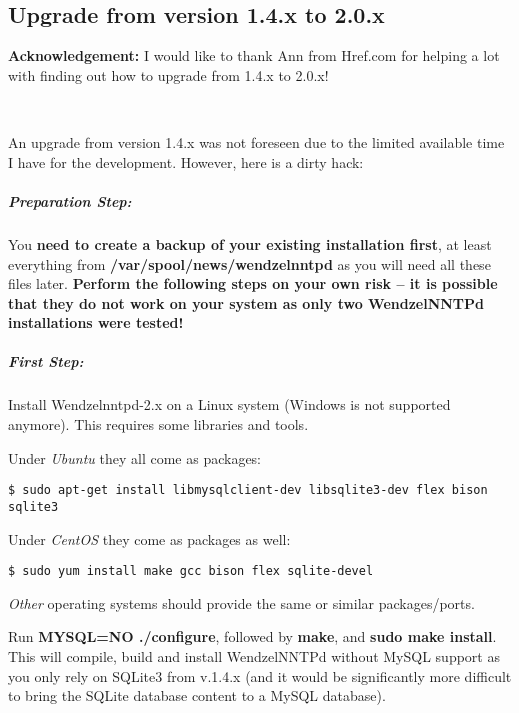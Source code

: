 \documentclass[12pt,fleqn,leqno]{scrbook}
\begin{document}
~

~

\hypertarget{upgrade-from-version-1.4.x-to-2.0.x-1}{%
\subsection{Upgrade from version 1.4.x to
2.0.x}\label{upgrade-from-version-1.4.x-to-2.0.x-1}}

\textbf{Acknowledgement:} I would like to thank Ann from Href.com for
helping a lot with finding out how to upgrade from 1.4.x to 2.0.x!

~

An upgrade from version 1.4.x was not foreseen due to the limited
available time I have for the development. However, here is a dirty
hack:

\hypertarget{preparation-step}{%
\subparagraph*{Preparation Step:}\label{preparation-step}}

You \textbf{need to create a backup of your existing installation
first}, at least everything from \textbf{/var/spool/news/wendzelnntpd}
as you will need all these files later. \textbf{Perform the following
steps on your own risk -- it is possible that they do not work on your
system as only two WendzelNNTPd installations were tested!}

\hypertarget{first-step}{%
\subparagraph*{First Step:}\label{first-step}}

Install Wendzelnntpd-2.x on a Linux system (Windows is not supported
anymore). This requires some libraries and tools.

Under \emph{Ubuntu} they all come as packages:

\begin{verbatim}
$ sudo apt-get install libmysqlclient-dev libsqlite3-dev flex bison sqlite3
\end{verbatim}

Under \emph{CentOS} they come as packages as well:

\begin{verbatim}
$ sudo yum install make gcc bison flex sqlite-devel
\end{verbatim}

\emph{Other} operating systems should provide the same or similar
packages/ports.

Run \textbf{MYSQL=NO ./configure}, followed by \textbf{make}, and
\textbf{sudo make install}. This will compile, build and install
WendzelNNTPd without MySQL support as you only rely on SQLite3 from
v.1.4.x (and it would be significantly more difficult to bring the
SQLite database content to a MySQL database).
\end{document}
